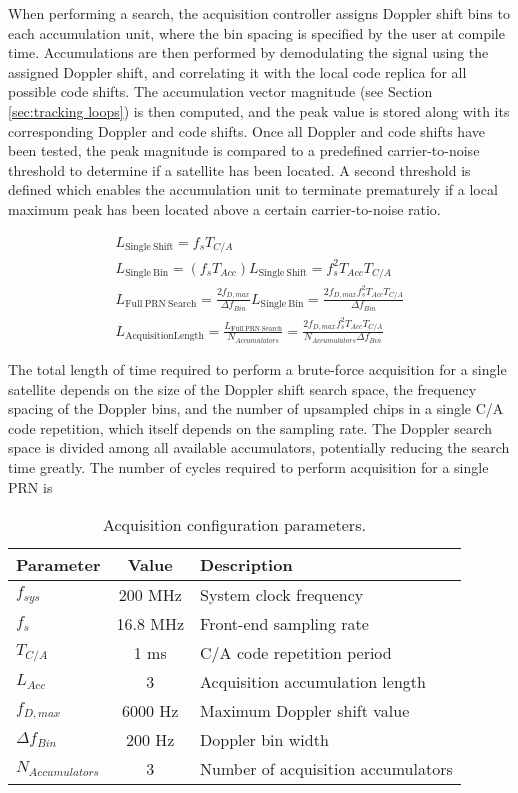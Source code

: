 \documentclass[12pt]{article}
\begin{document}
When performing a search, the acquisition controller assigns Doppler shift bins to each accumulation unit, where the bin spacing is specified by the user at compile time. Accumulations are then performed by demodulating the signal using the assigned Doppler shift, and correlating it with the local code replica for all possible code shifts. The accumulation vector magnitude (see Section \ref{sec:tracking loops}) is then computed, and the peak value is stored along with its corresponding Doppler and code shifts. Once all Doppler and code shifts have been tested, the peak magnitude is compared to a predefined carrier-to-noise threshold to determine if a satellite has been located. A second threshold is defined which enables the accumulation unit to terminate prematurely if a local maximum peak has been located above a certain carrier-to-noise ratio.

\begin{gather}
L_\mathrm{Single\ Shift} = f_s T_{C/A} \nonumber \\
L_\mathrm{Single\ Bin} = (f_s T_{Acc}) L_\mathrm{Single\ Shift} = f_s^2 T_{Acc} T_{C/A} \nonumber \\
L_\mathrm{Full\ PRN\ Search} = \frac{2 f_{D,max}}{\Delta f_{Bin}} L_\mathrm{Single\ Bin} = \frac{2 f_{D,max} f_s^2 T_{Acc} T_{C/A}}{\Delta f_{Bin}} \nonumber \\
\label{eqn:acq length}
L_\mathrm{Acquisition Length} = \frac{L_\mathrm{Full\ PRN\ Search}}{N_{Accumulators}} = \frac{2 f_{D,max} f_s^2 T_{Acc} T_{C/A}}{N_{Accumulators} \Delta f_{Bin}}
\end{gather}

The total length of time required to perform a brute-force acquisition for a single satellite depends on the size of the Doppler shift search space, the frequency spacing of the Doppler bins, and the number of upsampled chips in a single C/A code repetition, which itself depends on the sampling rate. The Doppler search space is divided among all available accumulators, potentially reducing the search time greatly. The number of cycles required to perform acquisition for a single PRN is

\begin{table}[h]
\centering
\begin{tabular}{ l c l }
    \hline \hline
    Parameter & Value & Description \\
    \hline
    $f_{sys}$ & 200 MHz & System clock frequency \\
    $f_s$ & 16.8 MHz & Front-end sampling rate \\
    $T_{C/A}$ & 1 ms & C/A code repetition period \\
    $L_{Acc}$ & 3 & Acquisition accumulation length \\
    $f_{D,max}$ & 6000 Hz & Maximum Doppler shift value \\
    $\Delta f_{Bin}$ & 200 Hz & Doppler bin width \\
    $N_{Accumulators}$ & 3 & Number of acquisition accumulators \\
    \hline
\end{tabular}
\caption{Acquisition configuration parameters.}
\label{tbl:acq configuration}
\end{table}
\end{document}
